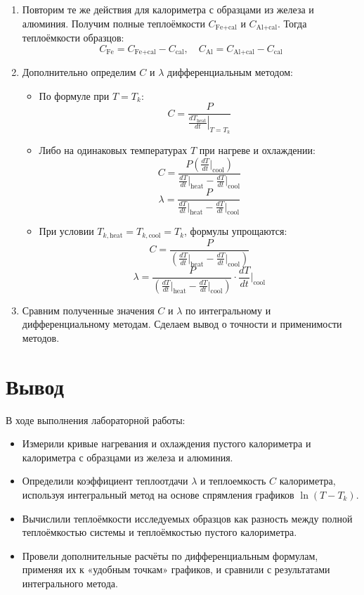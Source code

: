 \documentclass[a4paper,12pt]{article} %
\begin{document}
\begin{enumerate}
	\item Повторим те же действия для калориметра с образцами из железа и алюминия. Получим полные теплоёмкости $C_\text{Fe+cal}$ и $C_\text{Al+cal}$. Тогда теплоёмкости образцов:
	\[
	C_\text{Fe} = C_\text{Fe+cal} - C_\text{cal}, \quad C_\text{Al} = C_\text{Al+cal} - C_\text{cal}
	\]

	\item Дополнительно определим $C$ и $\lambda$ дифференциальным методом:
	\begin{itemize}
		\item По формуле при $T = T_k$:
		\[
		C = \frac{P}{\left. \frac{dT_{\text{heat}}}{dt} \right|_{T = T_k}} \tag{16}
		\]

		\item Либо на одинаковых температурах $T$ при нагреве и охлаждении:
		\[
		C = \frac{P \left( \frac{dT}{dt} \big|_{\text{cool}} \right)}{\frac{dT}{dt} \big|_{\text{heat}} - \frac{dT}{dt} \big|_{\text{cool}}} \tag{19}
		\]
		\[
		\lambda = \frac{P}{\frac{dT}{dt} \big|_{\text{heat}} - \frac{dT}{dt} \big|_{\text{cool}}} \tag{20}
		\]

		\item При условии $T_{k,\text{heat}} = T_{k,\text{cool}} = T_k$, формулы упрощаются:
		\[
		C = \frac{P}{\left( \frac{dT}{dt} \big|_{\text{heat}} - \frac{dT}{dt} \big|_{\text{cool}} \right)} \tag{21}
		\]
		\[
		\lambda = \frac{P}{\left( \frac{dT}{dt} \big|_{\text{heat}} - \frac{dT}{dt} \big|_{\text{cool}} \right)} \cdot \frac{dT}{dt} \big|_{\text{cool}} \tag{22}
		\]
	\end{itemize}

	\item Сравним полученные значения $C$ и $\lambda$ по интегральному и дифференциальному методам. Сделаем вывод о точности и применимости методов.
\end{enumerate}

\section*{Вывод}

В ходе выполнения лабораторной работы:
\begin{itemize}
    \item Измерили кривые нагревания и охлаждения пустого калориметра и калориметра с образцами из железа и алюминия.
    \item Определили коэффициент теплоотдачи $\lambda$ и теплоемкость $C$ калориметра, используя интегральный метод на основе спрямления графиков $\ln(T - T_k)$.
    \item Вычислили теплоёмкости исследуемых образцов как разность между полной теплоёмкостью системы и теплоёмкостью пустого калориметра.
    \item Провели дополнительные расчёты по дифференциальным формулам, применяя их к «удобным точкам» графиков, и сравнили с результатами интегрального метода.
\end{itemize}
\end{document}
